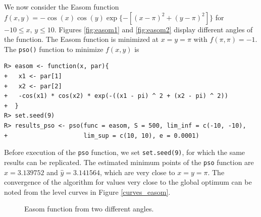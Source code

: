 \documentclass[10pt,letterpaper]{article}
\begin{document}
We now consider the Easom function $f(x,y) = -\cos(x)\cos(y)\exp\{-[(x-\pi)^2 + (y-\pi)^2]\}$ for $-10\leq x,\,y \leq 10$.
Figures \ref{fig:easom1} and \ref{fig:easom2} display different angles of the function.
The Easom function is
minimized at $x=y=\pi$ with $f(\pi,\pi)=-1$.
The \texttt{pso()} function to minimize $f(x,y)$ is

\begin{verbatim}
R> easom <- function(x, par){
+   x1 <- par[1]
+   x2 <- par[2]
+   -cos(x1) * cos(x2) * exp(-((x1 - pi) ^ 2 + (x2 - pi) ^ 2))
+  }
R> set.seed(9)
R> results_pso <- pso(func = easom, S = 500, lim_inf = c(-10, -10),
+                     lim_sup = c(10, 10), e = 0.0001)
\end{verbatim}

Before execution of the \texttt{pso} function, we set \texttt{set.seed(9)}, for which the same results can be replicated.
The estimated minimum points of the \texttt{pso} function are $\widehat{x} = 3.139752$ and $\widehat{y} = 3.141564$, which are very close to $x=y=\pi$.
The convergence of the algorithm for  values very close to the global optimum can be noted from the level curves  in Figure \ref{curves_easom}.

\begin{figure}[H]
\centering
{}
\caption{Easom function from two different angles.}
\label{fig:easom}
\end{figure}
\end{document}
